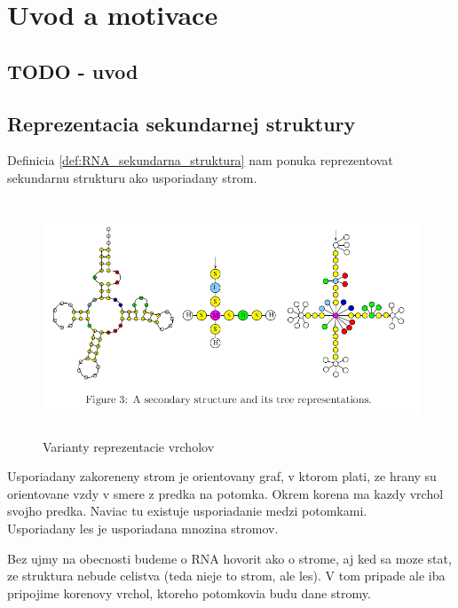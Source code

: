 
\usetikzlibrary{positioning, shapes, trees, graphs} %
\newcommand{\scale}{0.6}

\chapter{Uvod a motivace}

\section{TODO - uvod}


\section{Reprezentacia sekundarnej struktury}

Definicia \ref{def:RNA_sekundarna_struktura} nam ponuka reprezentovat sekundarnu strukturu
ako usporiadany strom.

\begin{figure}[H]
\centering
\includegraphics[width=130mm, height=70mm]{../img/stromova_reprezentacia_rna.png}
\caption{Varianty reprezentacie vrcholov}
\label{obr:RNA_vrcholy}
\end{figure}

\begin{definice}\label{def:strom}
	Usporiadany zakoreneny strom je orientovany graf, v ktorom plati, ze hrany su orientovane
	vzdy v smere z predka na potomka. Okrem korena ma kazdy vrchol svojho predka.
  Naviac tu existuje usporiadanie medzi potomkami.
	\\
	Usporiadany les je usporiadana mnozina stromov.
\end{definice}

Bez ujmy na obecnosti budeme o RNA hovorit ako o strome, aj ked sa moze stat, ze
struktura nebude celistva (teda nieje to strom, ale les). V tom pripade ale
iba pripojime korenovy vrchol, ktoreho potomkovia budu dane stromy.

